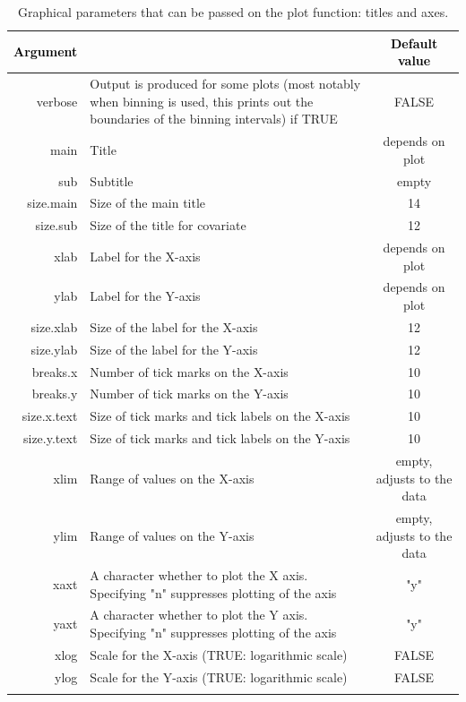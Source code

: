 \documentclass{article}
\begin{document}
\begin{table}[!h] 
\begin{center}
\begin{tabular}{| r p{8cm} c|}
\hline
\textbf{\textcolor{black}{Argument}} & \centering{\textbf{\textcolor{black}{Description }}} & \textbf{\textcolor{black}{Default value}} \\
\hline
{\ttfamily verbose} & Output is produced for some plots (most notably when binning is used, this prints out the boundaries of the binning intervals) if TRUE & FALSE \\
{\ttfamily main} & Title & depends on plot \\
{\ttfamily sub } & Subtitle & empty \\
{\ttfamily size.main } & Size of the main title & 14 \\
{\ttfamily size.sub  } & Size of the title for covariate & 12 \\

{\ttfamily xlab} & Label for the X-axis & depends on plot \\
{\ttfamily ylab} & Label for the Y-axis & depends on plot \\
{\ttfamily size.xlab} & Size of the label for the X-axis & 12 \\
{\ttfamily size.ylab} & Size of the label for the Y-axis & 12 \\
{\ttfamily breaks.x} & Number of tick marks on the X-axis & 10 \\
{\ttfamily breaks.y} & Number of tick marks on the Y-axis & 10 \\
{\ttfamily size.x.text} & Size of tick marks and tick labels on the X-axis & 10 \\
{\ttfamily size.y.text} & Size of tick marks and tick labels on the Y-axis & 10 \\

{\ttfamily xlim} & Range of values on the X-axis & empty, adjusts to the data \\
{\ttfamily ylim} & Range of values on the Y-axis & empty, adjusts to the data \\

{\ttfamily xaxt} & A character whether to plot the X axis. Specifying "n" suppresses plotting of the axis & "y"  \\
{\ttfamily yaxt} & A character whether to plot the Y axis. Specifying "n" suppresses plotting of the axis & "y" \\

{\ttfamily xlog} & Scale for the X-axis (TRUE: logarithmic scale) & FALSE \\
{\ttfamily ylog} & Scale for the Y-axis (TRUE: logarithmic scale) & FALSE \\

{\ttfamily } & &  \\
\hline
\end{tabular} 
\end{center}
\caption{Graphical parameters that can be passed on the plot function: titles and axes.} \label{tab:graphicalOptions1}
\end{table} 
\end{document}
